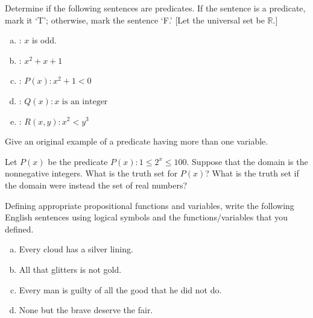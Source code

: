 \documentclass[11pt,letterpaper]{article}
\begin{document}
\homework{}

 Determine if the following sentences are predicates. If the sentence is a predicate, mark it `T'; otherwise, mark the sentence `F.' [Let the universal set be $\mathbb{R}$.]
	\begin{enumerate}[(a)]
	\item \uans{1.5cm}: $x$ is odd.
	\item \uans{1.5cm}: $x^2 + x + 1$
	\item \uans{1.5cm}: $P(x) \colon x^2 + 1 < 0$
	\item \uans{1.5cm}: $Q(x) \colon x \text{ is an integer}$
	\item \uans{1.5cm}: $R(x, y) \colon x^2 < y^3$
	\end{enumerate}
	


\newpage


	
 Give an original example of a predicate having more than one variable.



\newpage



 Let $P(x)$ be the predicate $P(x) \colon 1 \leq 2^x \leq 100$. Suppose that the domain is the nonnegative integers. What is the truth set for $P(x)$? What is the truth set if the domain were instead the set of real numbers? 



\newpage



 Defining appropriate propositional functions and variables, write the following English sentences using logical symbols and the functions/variables that you defined. 
        \begin{enumerate}[(a)]
        \item Every cloud has a silver lining.
        \item All that glitters is not gold. 
        \item Every man is guilty of all the good that he did not do.
        \item None but the brave deserve the fair. 
        \end{enumerate}



\newpage
\end{document}
